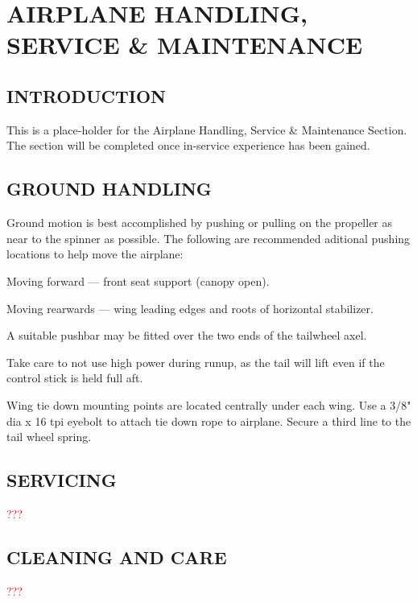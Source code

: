 \chapter{AIRPLANE HANDLING, SERVICE \& MAINTENANCE} \vspace{\minitocspacebefore} \minitoc \cleardoublepage

\section{INTRODUCTION} This is a place-holder for the Airplane Handling, Service \& Maintenance Section. The section will be completed once in-service experience has been gained.

\section{GROUND HANDLING}
Ground motion is best accomplished by pushing or pulling on the propeller as near to the
spinner as possible. The following are recommended aditional pushing locations to help move the
airplane: 

\begin{itemize*}
  \item Moving forward --- front seat support (canopy open).
  \item Moving rearwards --- wing leading edges and roots of horizontal stabilizer.
  \end{itemize*}

A suitable pushbar may be fitted over the two ends of the tailwheel axel.

Take care to not use high power during runup, as the tail will lift even if the control stick is held full aft.

Wing tie down mounting points are located centrally under each wing. Use a 3/8" dia x 16
tpi eyebolt to attach tie down rope to airplane. Secure a third line to the tail wheel spring.


\section{SERVICING}

\textcolor{red}{???}

\section{CLEANING AND CARE}

\textcolor{red}{???}

